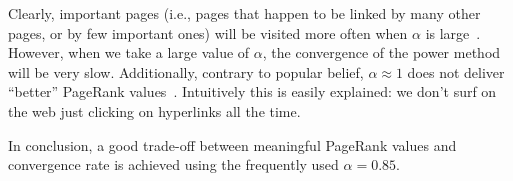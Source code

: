 \documentclass[a4paper,english,11pt]{scrartcl}
\begin{document}
Clearly, important pages (i.e., pages that happen to be linked by many other pages, or by few important ones) will be visited more often when $\alpha$ is large~\cite{ams}. However, when we take a large value of $\alpha$, the convergence of the power method will be very slow. Additionally, contrary to popular belief, $\alpha\approx1$ does not deliver ``better'' PageRank values~\cite{function}. Intuitively this is easily explained: we don't surf on the web just clicking on hyperlinks all the time. 

In conclusion, a good trade-off between meaningful PageRank values and convergence rate is achieved using the frequently used $\alpha=0.85$.


% 
% 
\end{document}

